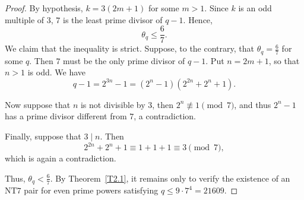 \documentclass[12pt]{amsart}
\theoremstyle{definition}
\theoremstyle{remark}
\numberwithin{equation}{section}
\begin{document}
\begin{proof}
By hypothesis, $k=3(2m+1)$ for some $m> 1$. Since $k$ is an odd multiple of $3$, $7$ is the least prime divisor of $q-1$. Hence,
\[
\theta_q
\leq\frac{6}{7}.
\]
We claim that the inequality is strict. Suppose, to the contrary, that $\theta_q=\frac{6}{7}$ for some $q$.
Then $7$ must be the only prime divisor of $q-1$. Put $n=2m+1$, so that $n>1$ is odd. We have
\[
q-1=2^{3n}-1
=(2^n-1)(2^{2n}+2^n+1).
\]

Now suppose that $n$ is not divisible by $3$, then $2^n\not\equiv 1\pmod 7$, and thus $2^n-1$ has a prime divisor different from $7$, a contradiction.

Finally, suppose that $3\mid n$. Then 
\[
2^{2n}+2^n+1\equiv 1+1+1\equiv3\pmod 7,
\]
 which is again a contradiction.

Thus, $\theta_q<\frac{6}{7}$.
By Theorem~\ref{T2.1}, it remains only to verify the existence of an $\mathrm{NT}7$ pair for even prime powers satisfying $q\leq 9\cdot7^4=21609$. 


\end{proof}
\end{document}
